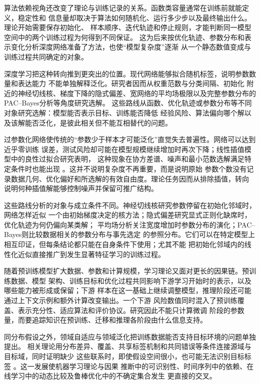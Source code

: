 算法依赖视角还改变了理论与训练记录的关系。函数类容量通常在训练前就能定义，稳定性和
信息量却取决于算法如何随机化、运行多少步以及最终输出什么。理论开始需要保存初始化、
样本顺序、迭代轨迹和停止规则，才能判断同一模型空间中的两个训练过程为何得到不同保证。
这为后来按优化轨迹、参数分布和表示变化分析深度网络准备了方法，也使“模型复杂度”逐渐
从一个静态数值变成与训练过程共同确定的对象。

深度学习把这种转向推到更突出的位置。现代网络能够拟合随机标签，说明参数数量和表达能力
不能单独解释泛化。研究者因而从权重范数与分类间隔、初始化
附近的神经切线核、梯度下降的隐式偏差、宽网络的平均场极限以及完整参数分布的
PAC--Bayes分析等角度研究选解。
这些路线从函数、优化轨迹或参数分布等不同对象研究选解：模型能否表示目标、训练能否降低
经验风险、算法偏向哪个解以及该解能否泛化，是彼此相关但不能互相替代的问题。

过参数化网络使传统的“参数少于样本才可能泛化”直觉失去普遍性。网络可以达到近乎零训练
误差，测试风险却可能在模型规模继续增加时再次下降；线性插值模型中的良性过拟合研究表明，
这种现象在协方差谱、噪声和最小范数选解满足特定条件时也能出现
。这并不说明复杂度不再重要，而是说明原始
参数个数没有记录数据几何、优化偏好和所选解的有效自由度。理论任务因而从排除插值，转向
说明何种插值解能够控制噪声并保留可推广结构。

这些路线分析的对象与成立条件不同。神经切线核研究参数停留在初始化邻域时，网络怎样近似
一个由初始梯度决定的核方法；隐式偏差研究显式正则化缺席时，优化轨迹为何仍偏向某类解；
平均场分析关注宽度增加时参数分布的演化；PAC--Bayes则比较数据相关的参数分布与事先选定
的参照分布。它们可以在特定模型上相互印证，但每条结论都只能在自身条件下使用；尤其不能
把初始化邻域内的线性化近似直接推广到发生显著特征学习的训练过程。

随着预训练模型扩大数据、参数和计算规模，学习理论又面对更长的因果链。预训练数据、模型
架构、训练目标和优化过程共同影响下游学习开始时的表示，以及哪些能力被形成或保留；下游
样本在这一基础上继续调整模型，推理阶段还可能通过上下文示例和额外计算改变输出。一个下游
风险数值同时混入了预训练覆盖、表示充分性、适应算法和评价协议。研究因此不能只计算微调
阶段的参数量，而要追踪知识在预训练、迁移和推理各阶段由什么信息支持。

同分布假设之外，领域自适应与领域泛化把训练数据能否支持目标环境的问题单独提出。
相关理论用分布差异、覆盖、共享标签机制和共同错误等条件连接源域与目标域，同时证明缺少
这些联系时，即使假设空间很小，也可能无法识别目标标签
。这一发展使机器学习理论与因果
推断中的可识别性、时间序列中的依赖、在线学习中的动态比较及鲁棒优化中的不确定集合发生
更直接的交叉。

